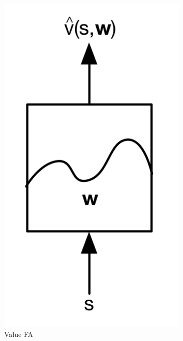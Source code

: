 \begin{figure}[H]
    \centering
    \begin{subfigure}[b]{0.25\textwidth}
        \includegraphics[width=\textwidth]{figures/fa-v.png}
        \caption{Value FA}
        \label{fig:fav}
    \end{subfigure}
    \begin{subfigure}[b]{0.25\textwidth}

\end{subfigure}
\end{figure}
